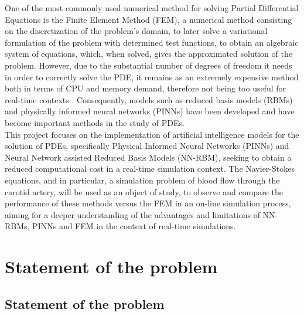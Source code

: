 \documentclass[12pt,letterpaper]{article}
\begin{document}
One of the most commonly used numerical method for solving Partial Differential Equations is the Finite Element Method (FEM), a numerical method consisting on the discretization of the problem's domain, to later solve a variational formulation of the problem with determined test functions, to obtain an algebraic system of equations, which, when solved, gives the approximated solution of the problem. However, due to the substantial number of degrees of freedom it needs in order to correctly solve the PDE, it remains as an extremely expensive method both in terms of CPU and memory demand, therefore not being too useful for real-time contexts\cite{hesthaven2018non} \cite{PINNQuarteroni}. Consequently, models such as reduced basis models (RBMs) and physically informed neural networks (PINNs) have been developed and have become important methods in the study of PDEs.\\

This project focuses on the implementation of artificial intelligence models for the solution of PDEs, specifically Physical Informed Neural Networks (PINNs) and Neural Network assisted Reduced Basis Models (NN-RBM), seeking to obtain a reduced computational cost in a real-time simulation context. The Navier-Stokes equations, and in particular, a simulation problem of blood flow through the carotid artery, will be used as an object of study, to observe and compare the performance of these methods versus the FEM in an on-line simulation process, aiming for a deeper understanding of the advantages and limitations of NN-RBMs, PINNs and FEM in the context of real-time simulations.

\section{Statement of the problem}



\subsection{Statement of the problem}
\end{document}
